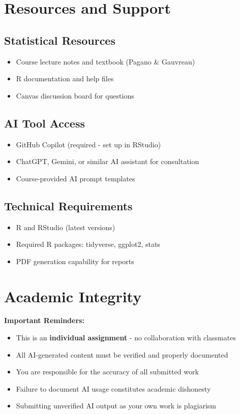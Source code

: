 \documentclass[11pt]{article}
\begin{document}
\section{Resources and Support}

\subsection{Statistical Resources}
\begin{itemize}
\item Course lecture notes and textbook (Pagano \& Gauvreau)
\item R documentation and help files
\item Canvas discussion board for questions
\end{itemize}

\subsection{AI Tool Access}
\begin{itemize}
\item GitHub Copilot (required - set up in RStudio)
\item ChatGPT, Gemini, or similar AI assistant for consultation
\item Course-provided AI prompt templates
\end{itemize}

\subsection{Technical Requirements}
\begin{itemize}
\item R and RStudio (latest versions)
\item Required R packages: tidyverse, ggplot2, stats
\item PDF generation capability for reports
\end{itemize}

\section{Academic Integrity}

\begin{tcolorbox}[colback=red!5,colframe=red,boxrule=1pt,arc=2pt,left=6pt,right=6pt,top=6pt,bottom=6pt]
\textbf{Important Reminders:}
\begin{itemize}
\item This is an \textbf{individual assignment} - no collaboration with classmates
\item All AI-generated content must be verified and properly documented
\item You are responsible for the accuracy of all submitted work
\item Failure to document AI usage constitutes academic dishonesty
\item Submitting unverified AI output as your own work is plagiarism
\end{itemize}
\end{tcolorbox}
\end{document}
